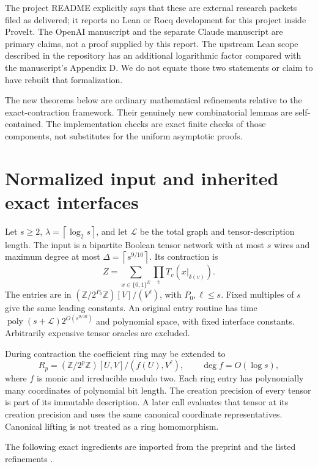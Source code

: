 \documentclass[11pt,letterpaper]{article}
\theoremstyle{remark}\newtheorem{remark}[theorem]{Remark}
\newcommand{\poly}{\operatorname{poly}}
\newcommand{\ceil}[1]{\left\lceil#1\right\rceil}
\begin{document}
The project README explicitly says that these are external research packets
filed as delivered; it reports no Lean or Rocq development for this project
inside ProveIt. The OpenAI manuscript and the separate Claude manuscript
are primary claims, not a proof supplied by this report. The upstream Lean
scope described in the repository has an additional logarithmic factor
compared with the manuscript's Appendix D. We do not equate those two
statements or claim to have rebuilt that formalization.

The new theorems below are ordinary mathematical refinements relative to
the exact-contraction framework. Their genuinely new combinatorial lemmas
are self-contained. The implementation checks are exact finite checks of
those components, not substitutes for the uniform asymptotic proofs.

\section{Normalized input and inherited exact interfaces}
\label{sec:interface}

Let $s\ge2$, $\lambda=\ceil{\log_2s}$, and let $\mathcal L$ be the total
graph and tensor-description length. The input is a bipartite Boolean
tensor network with at most $s$ wires and maximum degree at most
$\Delta=\ceil{s^{9/10}}$. Its contraction is
\[
 Z=\sum_{x\in\{0,1\}^{E}}\prod_v T_v(x|_{\delta(v)}).
\]
The entries are in $(\mathbb Z/2^{P_0}\mathbb Z)[V]/(V^\ell)$, with
$P_0,\ell\le s$. Fixed multiples of $s$ give the same leading constants.
An original entry routine has time
$\poly(s+\mathcal L)2^{O(s^{9/10})}$ and polynomial space, with fixed
interface constants. Arbitrarily expensive tensor oracles are excluded.

During contraction the coefficient ring may be extended to
\[
 R_p=(\mathbb Z/2^p\mathbb Z)[U,V]/(f(U),V^\ell),
 \qquad \deg f=O(\log s),
\]
where $f$ is monic and irreducible modulo two. Each ring entry has
polynomially many coordinates of polynomial bit length. The creation
precision of every tensor is part of its immutable description. A later
call evaluates that tensor at its creation precision and uses the same
canonical coordinate representatives. Canonical lifting is not treated
as a ring homomorphism.

The following exact ingredients are imported from the preprint and the
listed refinements \cite{openai,asymmetric,joint,adaptive,tree}.
\end{document}
